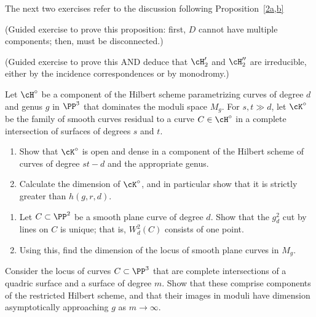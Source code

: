 The next two exercises refer to the discussion following Proposition~\ref{2a,b}
\begin{exercise}\label{character of D}
(Guided exercise to prove this proposition: first, $D$ cannot have multiple components; then, must be disconnected.)
\end{exercise}

\begin{exercise}
(Guided exercise to prove this AND deduce that $\cH_{2}'$ and $\cH_{2}''$ are irreducible, either by the incidence correspondences or by monodromy.)
\end{exercise}

\begin{exercise}\label{many large components}
Let $\cH^\circ$ be a component of the Hilbert scheme parametrizing curves of degree $d$ and genus $g$ in $\PP^3$ that dominates the moduli space $M_g$. For $s, t \gg d$, let $\cK^\circ$ be the family of smooth curves residual to a curve $C \in  \cH^\circ$ in a complete intersection of surfaces of degrees $s$ and $t$.
\begin{enumerate}
\item Show that $\cK^\circ$ is open and dense in a component of the Hilbert scheme of curves of degree $st-d$ and the appropriate genus.
\item Calculate the dimension of $\cK^\circ$, and in particular show that it is strictly greater than $h(g,r,d)$.
\end{enumerate}
\end{exercise}

\begin{exercise}\label{moduli of plane curves}
\begin{enumerate}
\item Let $C \subset \PP^2$ be a smooth plane curve of degree $d$. Show that the $g^2_d$ cut by lines on $C$ is unique; that is, $W^2_d(C)$ consists of one point.
\item Using this, find the dimension of the locus of smooth plane curves in $M_g$.
\end{enumerate}
\end{exercise}

\begin{exercise}\label{balanced CI}
Consider the locus of curves $C \subset \PP^3$ that are complete intersections of a quadric surface and a surface of degree $m$. Show that these comprise components of the restricted Hilbert scheme, and that their images in moduli have dimension asymptotically approaching $g$ as $m \to \infty$.
\end{exercise}

